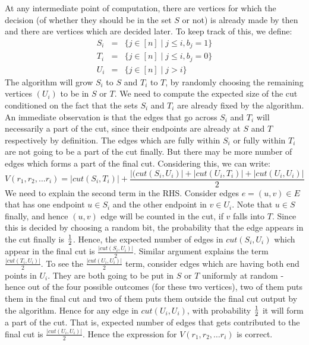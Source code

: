 At any intermediate point of computation, there are vertices for which the decision (of whether they should be in the set $S$ or not) is already made by then and there are vertices which are decided later. To keep track of this, we define:
\begin{eqnarray*}
S_i & = & \{ j \in [n] \mid j \le i, b_j = 1 \} \\
T_i & = & \{ j \in [n] \mid j \le i, b_j = 0 \} \\
U_i & = & \{ j \in [n] \mid j > i \}
\end{eqnarray*}
The algorithm will grow $S_i$ to $S$ and $T_i$ to $T$, by randomly choosing the remaining vertices $(U_i)$ to be in $S$ or $T$. We need to compute the expected size of the cut conditioned on the fact that the sets $S_i$ and $T_i$ are already fixed by the algorithm. An immediate observation is that  the edges that go across $S_i$ and $T_i$ will necessarily a part of the cut, since their endpoints are already at $S$ and $T$ respectively by definition. The edges which are fully within $S_i$ or fully within $T_i$ are not going to be a part of the cut finally. But there may be more number of edges which forms a part of the final cut. Considering this, we can write:
$$V(r_1, r_2, \ldots r_i) = |cut(S_i, T_i)| + \frac{|(cut(S_i, U_i)| + |cut(U_i,T_i)| + |cut(U_i,U_i)|}{2}$$
We need to explain the second term in the RHS. Consider edges $e=(u,v) \in E$ that has one endpoint $u \in S_i$ and the other endpoint in $v \in U_i$. Note that $u \in S$ finally, and hence $(u,v)$ edge will be counted in the cut, if $v$ falls into $T$. Since this is decided by choosing a random bit, the probability that the edge appears in the cut finally is $\frac{1}{2}$. Hence, the expected number of edges in $cut(S_i,U_i)$ which appear in the final cut is $\frac{|cut(S_i,U_i)|}{2}$. Similar argument explains the term $\frac{|cut(T_i,U_i)|}{2}$. To see the $\frac{|cut(U_i,U_i)|}{2}$ term, consider edges which are having both end points in $U_i$. They are both going to be put in $S$ or $T$ uniformly at random - hence out of the four possible outcomes (for these two vertices), two of them puts them in the final cut and two of them puts them outside the final cut output by the algorithm. Hence for any edge in $cut(U_i, U_i)$, with probability $\frac{1}{2}$ it will form a part of the cut. That is, expected number of edges that gets contributed to the final cut is $\frac{|cut(U_i,U_i)|}{2}$. Hence the expression for $V(r_1, r_2, \ldots r_{i})$ is correct.


